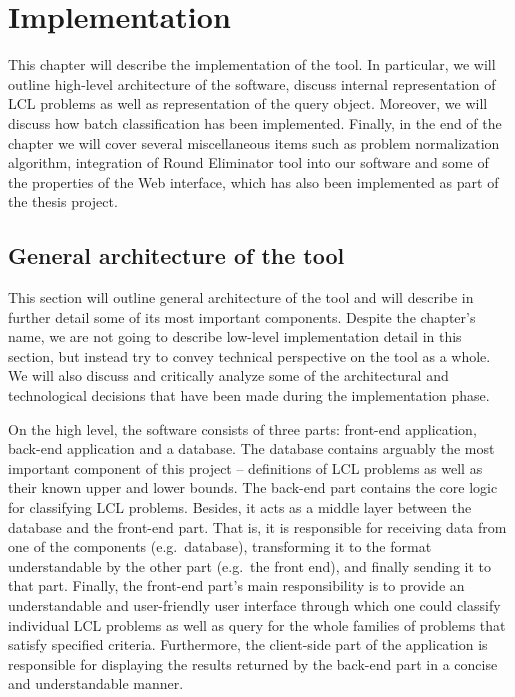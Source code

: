 \chapter{Implementation}
\label{chapter:implementation}

This chapter will describe the implementation of the tool.
In particular, we will outline high-level architecture of
the software, discuss internal representation of
LCL problems as well as representation of the query object.
Moreover, we will discuss how batch classification has been
implemented. Finally, in the end of the chapter we will cover
several miscellaneous items such as problem normalization
algorithm, integration of Round Eliminator tool into
our software and some of the properties of the Web interface,
which has also been implemented as part of the thesis project.

\section{General architecture of the tool}

This section will outline general architecture of the tool and
will describe in further detail some of its most important
components. Despite the chapter's name, we are not going
to describe low-level implementation detail in this section,
but instead try to convey technical perspective on the tool
as a whole. We will also discuss and critically analyze some
of the architectural and technological decisions that have been
made during the implementation phase.

On the high level, the software consists of three parts:
front-end application, back-end application and a database.
The database contains arguably the most important component
of this project -- definitions of LCL problems as well as their
known upper and lower bounds. The back-end part contains
the core logic for classifying LCL problems. Besides, it acts
as a middle layer between the database and the front-end part.
That is, it is responsible for receiving data from one of the
components (e.g.\ database), transforming it to the
format understandable by the other part (e.g.\ the front end),
and finally sending it to that part. Finally, the
front-end part's main responsibility is to provide
an understandable and user-friendly user interface
through which one could classify individual LCL problems
as well as query for the whole families of problems
that satisfy specified criteria. Furthermore,
the client-side part of the application is
responsible for displaying the results returned by the
back-end part in a concise and understandable manner.

